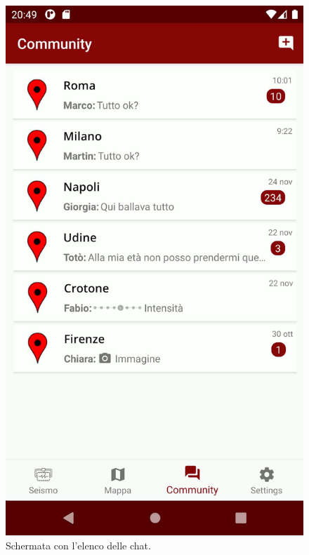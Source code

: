 \begin{figure}[p]
\centering

\begin{minipage}{0.45\linewidth}
\centering
\includegraphics[width=0.85\linewidth]{assets/02/menu.png}
\caption{Schermata con l'elenco delle chat.}
\label{fig:android_menu}
\end{minipage}\hfill
\begin{minipage}{0.45\linewidth}
\centering

\end{minipage}
\end{figure}
